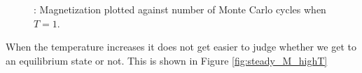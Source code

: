 \documentclass{article}
\begin{document}
{		\begin{figure}[H]
		\caption{: Magnetization plotted against number of Monte Carlo cycles when $T = 1$. }
		\label{fig:steady_M}
		\end{figure}

		When the temperature increases it does not get easier to judge whether we get to an equilibrium state or not. This is shown in Figure \ref{fig:steady_M_highT}

}
\end{document}

